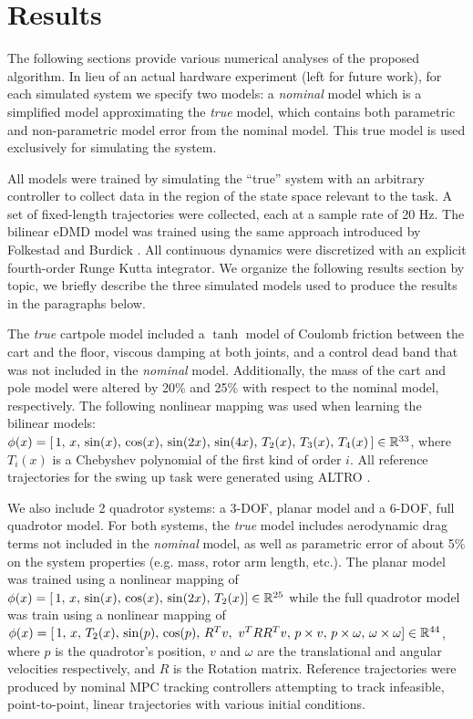 \documentclass{article}
\begin{document}
\section{Results} \label{sec:results}

The following sections provide various numerical analyses of the proposed algorithm.  In
lieu of an actual hardware experiment (left for future work), for each simulated system we
specify two models: a \textit{nominal} model which is a simplified model approximating the
\textit{true} model, which contains both parametric and non-parametric model error from
the nominal model. This true model is used exclusively for simulating the system.

All models were trained by simulating the ``true'' system with an arbitrary controller to 
collect data in the region of the state space relevant to the task. A set of fixed-length 
trajectories were collected, each at a sample rate of 20 Hz. The bilinear eDMD model was
trained using the same approach introduced by Folkestad and Burdick \cite{Folkestad2021}.
All continuous dynamics were discretized with an explicit
fourth-order Runge Kutta integrator. 
We organize the following results section by topic, we briefly describe the three simulated
models used to produce the results in the paragraphs below.

The \textit{true} cartpole model included a $\tanh$ model of Coulomb friction between
the cart and the floor, viscous damping at both joints, and a control dead band that was not
included in the \textit{nominal} model. Additionally, the mass of the cart and pole model
were altered by 20\% and 25\% with respect to the nominal model, respectively.  The
following nonlinear mapping was used when learning the bilinear models: 
$\phi(x) = [\, 1,\,
x,\, \sin(x),\, \cos(x),\, \sin(2x),\, \sin(4x),\, T_2(x),\, T_3(x),\, T_4(x)\, ] \in
\mathbb{R}^{33}$, where $T_i(x)$ is a Chebyshev polynomial of the first kind of order $i$. 
All reference trajectories for the swing up task were generated using ALTRO 
\cite{Howell2019,Jackson2021}.

We also include 2 quadrotor systems: a 3-DOF, planar model and a 6-DOF, full quadrotor model. For both systems,
the \textit{true} model includes aerodynamic drag terms not included in the \textit{nominal} model, as well as parametric error of about 5\% on the system properties (e.g. mass, rotor arm length, etc.). The planar model was trained using a nonlinear mapping of $\phi(x) = [\, 1,\, x,\, \sin(x),\, \cos(x),\, \sin(2x),\, T_2(x) ] \in \mathbb{R}^{25}$ while the full quadrotor model was train using a nonlinear mapping of $\phi(x) = [\, 1,\, x,\, T_2(x),\, \sin(p),\, \cos(p),\, R^{T}v,\ v^{T}RR^{T}v,\, p \times v,\, p \times \omega,\, \omega \times \omega ] \in \mathbb{R}^{44}$, where $p$ is the quadrotor's position, $v$ and $\omega$ are the translational and angular velocities respectively, and $R$ is the Rotation matrix. Reference trajectories were produced by nominal MPC tracking controllers attempting to track infeasible, point-to-point, linear trajectories with various initial conditions.
\end{document}
